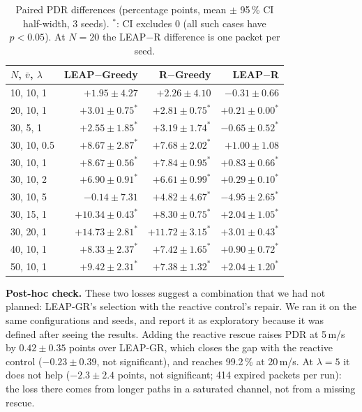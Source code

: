 \begin{table}[t]
\centering
\caption{Paired PDR differences (percentage points, mean $\pm$ 95\,\% CI half-width, 3 seeds). $^{*}$: CI
excludes 0 (all such cases have $p<0.05$). At $N=20$ the LEAP$-$R difference is one packet per seed.}
\label{tab:gains}
\footnotesize
\setlength{\tabcolsep}{3pt}
\begin{tabular}{@{}lrrr@{}}
\toprule
$N$, $\bar v$, $\lambda$ & LEAP$-$Greedy & R$-$Greedy & LEAP$-$R \\
\midrule
10, 10, 1 & $+1.95\pm4.27$ & $+2.26\pm4.10$ & $-0.31\pm0.66$ \\
20, 10, 1 & $+3.01\pm0.75^{*}$ & $+2.81\pm0.75^{*}$ & $+0.21\pm0.00^{*}$ \\
30, 5, 1 & $+2.55\pm1.85^{*}$ & $+3.19\pm1.74^{*}$ & $-0.65\pm0.52^{*}$ \\
30, 10, 0.5 & $+8.67\pm2.87^{*}$ & $+7.68\pm2.02^{*}$ & $+1.00\pm1.08$ \\
30, 10, 1 & $+8.67\pm0.56^{*}$ & $+7.84\pm0.95^{*}$ & $+0.83\pm0.66^{*}$ \\
30, 10, 2 & $+6.90\pm0.91^{*}$ & $+6.61\pm0.99^{*}$ & $+0.29\pm0.10^{*}$ \\
30, 10, 5 & $-0.14\pm7.31$ & $+4.82\pm4.67^{*}$ & $-4.95\pm2.65^{*}$ \\
30, 15, 1 & $+10.34\pm0.43^{*}$ & $+8.30\pm0.75^{*}$ & $+2.04\pm1.05^{*}$ \\
30, 20, 1 & $+14.73\pm2.81^{*}$ & $+11.72\pm3.15^{*}$ & $+3.01\pm0.43^{*}$ \\
40, 10, 1 & $+8.33\pm2.37^{*}$ & $+7.42\pm1.65^{*}$ & $+0.90\pm0.72^{*}$ \\
50, 10, 1 & $+9.42\pm2.31^{*}$ & $+7.38\pm1.32^{*}$ & $+2.04\pm1.20^{*}$ \\
\bottomrule
\end{tabular}
\end{table}

\textbf{Post-hoc check.} These two losses suggest a combination that we had not planned: LEAP-GR's
selection with the reactive control's repair. We ran it on the same configurations and seeds, and report it
as exploratory because it was defined after seeing the results. Adding the reactive rescue raises PDR at
5\,m/s by $0.42\pm0.35$ points over LEAP-GR, which closes the gap with the reactive control ($-0.23\pm0.39$,
not significant), and reaches 99.2\,\% at 20\,m/s. At $\lambda=5$ it does not help ($-2.3\pm2.4$ points, not
significant; 414 expired packets per run): the loss there comes from longer paths in a saturated channel, not
from a missing rescue.

